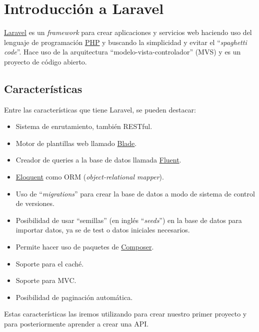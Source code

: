 \chapter{Introducción a Laravel}

\href{https://laravel.com/}{Laravel} es un \textit{framework} para crear aplicaciones y servicios web haciendo uso del lenguaje de programación \href{https://es.wikipedia.org/wiki/PHP}{PHP} y buscando la simplicidad y evitar el “\textit{spaghetti code}”. Hace uso de la arquitectura “modelo-vista-controlador” (MVS) y es un proyecto de código abierto.

\section{Características}
Entre las características que tiene Laravel, se pueden destacar:

\begin{itemize}
    \item Sistema de enrutamiento, también RESTful.
    \item Motor de plantillas web llamado \href{https://laravel.com/docs/10.x/blade}{Blade}.
    \item Creador de queries a la base de datos llamada \href{https://laravel.com/docs/10.x/queries}{Fluent}.
    \item \href{https://laravel.com/docs/10.x/eloquent}{Eloquent} como ORM (\textit{object-relational mapper}).
    \item Uso de “\textit{migrations}” para crear la base de datos a modo de sistema de control de versiones.
    \item Posibilidad de usar “semillas” (en inglés “\textit{seeds}”) en la base de datos para importar datos, ya se de test o datos iniciales necesarios.
    \item Permite hacer uso de paquetes de \href{https://getcomposer.org/}{Composer}.
    \item Soporte para el caché.
    \item Soporte para MVC.
    \item Posibilidad de paginación automática.
\end{itemize}

Estas características las iremos utilizando para crear nuestro primer proyecto y para posteriormente aprender a crear una API.
